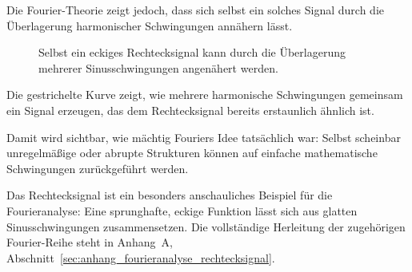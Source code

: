 Die Fourier-Theorie zeigt jedoch,
dass sich selbst ein solches Signal
durch die Überlagerung harmonischer Schwingungen annähern lässt.

\FloatBarrier
\begin{figure}[h]
	\centering
	\caption{Selbst ein eckiges Rechtecksignal kann durch die Überlagerung mehrerer Sinusschwingungen angenähert werden.}
	\label{fig:rechteck-fourier}
\end{figure}

Die gestrichelte Kurve zeigt,
wie mehrere harmonische Schwingungen gemeinsam
ein Signal erzeugen,
das dem Rechtecksignal bereits erstaunlich ähnlich ist.

Damit wird sichtbar,
wie mächtig Fouriers Idee tatsächlich war:
Selbst scheinbar unregelmäßige oder abrupte Strukturen
können auf einfache mathematische Schwingungen zurückgeführt werden.

\begin{NoteBox}
	\small
	\label{box:fourier-vertiefung-rechtecksignal}
	Das Rechtecksignal ist ein besonders anschauliches Beispiel für die Fourieranalyse:
	Eine sprunghafte, eckige Funktion lässt sich aus glatten Sinusschwingungen zusammensetzen.
	Die vollständige Herleitung der zugehörigen Fourier-Reihe steht in
	Anhang~A, Abschnitt~\ref{sec:anhang_fourieranalyse_rechtecksignal}.
\end{NoteBox}

